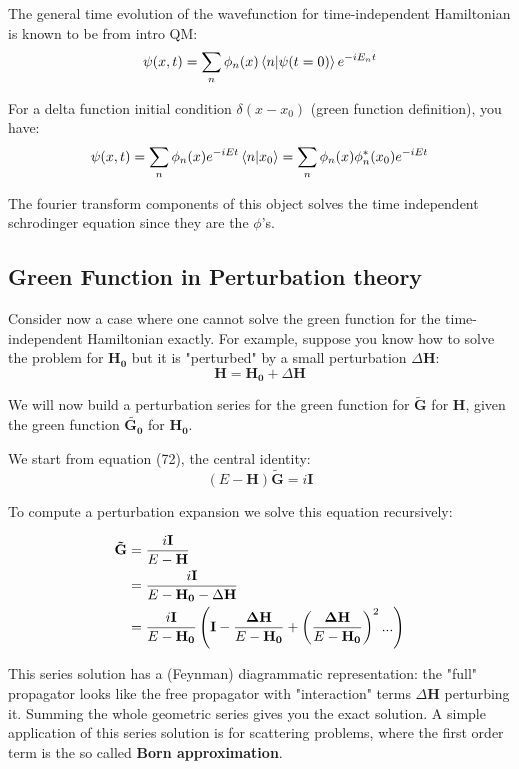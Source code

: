 \documentclass[11pt]{article}
\theoremstyle{definition}
\begin{document}
The general time evolution of the wavefunction for time-independent Hamiltonian is known to be from intro QM:
\begin{align}
\psi(x, t) = \sum_n \phi_n(x) \braket{n|\psi(t=0)} e^{-i E_n t} \\
\end{align}

For a delta function initial condition $\delta(x-x_0)$ (green function definition), you have:
\begin{align}
\psi(x, t) = \sum_n \phi_n(x) e^{- i Et} \braket{n|x_0} = \sum_n \phi_n(x) \phi_n^*(x_0) e^{-i Et}
\end{align}

The fourier transform components of this object solves the time independent schrodinger equation since they are the $\phi$'s.

\subsection{Green Function in Perturbation theory}
Consider now a case where one cannot solve the green function for the time-independent Hamiltonian exactly.  For example, suppose you know how to solve the problem for $\mathbf{H_0}$ but it is "perturbed" by a small perturbation $\Delta \mathbf{H}$:
 $$\mathbf{H} = \mathbf{H_0} + \Delta \mathbf{H}$$

We will now build a perturbation series for the green function for $\tilde{\mathbf{G}}$ for $\mathbf{H}$, given the green function $\tilde{\mathbf{G_0}}$ for $\mathbf{H_0}$.

We start from equation (72), the central identity:
$$ (E- \mathbf{H}) \mathbf{\tilde{G}} = i \mathbf{I}$$

To compute a perturbation expansion we solve this equation recursively:

\begin{align}
\mathbf{\tilde{G}} &= {i \mathbf{I} \over E - \mathbf{H}} \\
& = {i \mathbf{I} \over E - \mathbf{H_0} - \Delta \mathbf{H}} \\
& = {i \mathbf{I} \over E - \mathbf{H_0}} \left(\mathbf{I} - {\mathbf{\Delta H} \over E - \mathbf{H_0}} + \left({\mathbf{\Delta H} \over E - \mathbf{H_0}} \right)^2 ...\right)
\end{align}

This series solution has a (Feynman) diagrammatic representation: the "full" propagator looks like the free propagator with "interaction" terms $\Delta \mathbf{H}$ perturbing it.  Summing the whole geometric series gives you the exact solution.  A simple application of this series solution is for scattering problems, where the first order term is the so called \textbf{Born approximation}.
\end{document}
